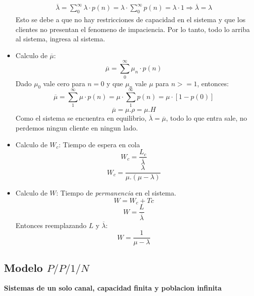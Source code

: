 \documentclass{article}
\begin{document}
\begin{itemize}
\begin{align}
            \overline{\lambda} = \sum_{0}^{\infty}\lambda \cdot p(n) = \lambda \cdot \sum_{0}^{\infty} p(n) = \lambda \cdot 1 \Rightarrow \overline{\lambda} = \lambda
        \end{align}  
        Esto se debe a que no hay restricciones de capacidad en el sistema y que los clientes no presentan el fenomeno de impaciencia.
        Por lo tanto, todo lo arriba al sistema, ingresa al sistema.
    \item Calculo de \(\overline{\mu}\): 
        \[
            \overline{\mu} = \sum_{0}^{\infty}\mu_n \cdot p(n) 
        \]
        Dado \(\mu_0\) vale cero para \(n=0\) y que \(\mu_n\) vale \(\mu\) para \(n>=1\), entonces:
        \[
            \overline{\mu} = \sum_{1}^{\infty}\mu \cdot p(n) = \mu \cdot \sum_{1}^{\infty} p(n) = \mu \cdot [1-p(0)] 
        \]
        \begin{equation} \label{eu_eqn}
            \overline{\mu} = \mu.\rho = \mu.H
        \end{equation}  
        Como el sistema se encuentra en equilibrio, \(\overline{\lambda} = \overline{\mu}\), todo lo que entra sale, no perdemos ningun cliente en ningun lado.
    \item Calculo de \(W_c\): Tiempo de espera en cola
        \begin{equation}
            W_c = \frac{L_c}{\overline{\lambda}}
        \end{equation}  
        \begin{equation} \label{eu_eqn}
            W_c = \frac{\lambda}{\mu.(\mu-\lambda)}
        \end{equation}  
    \item Calculo de \(W\): Tiempo de \textit{permanencia} en el sistema.
        \begin{equation} \label{eu_eqn}
            W = W_c+Tc 
        \end{equation}  
        \begin{equation} \label{eu_eqn}
            W = \frac{L}{\overline{\lambda}} 
        \end{equation}
        Entonces reemplazando \(L\) y \(\overline{\lambda}\):  
        \begin{equation} \label{eu_eqn}
            W = \frac{1}{\mu - \lambda} 
        \end{equation}  
        
\end{itemize}

\newpage
\subsection{Modelo \(P/P/1/N\)}
\textbf{Sistemas de un solo canal, capacidad finita y poblacion infinita}
\end{document}
